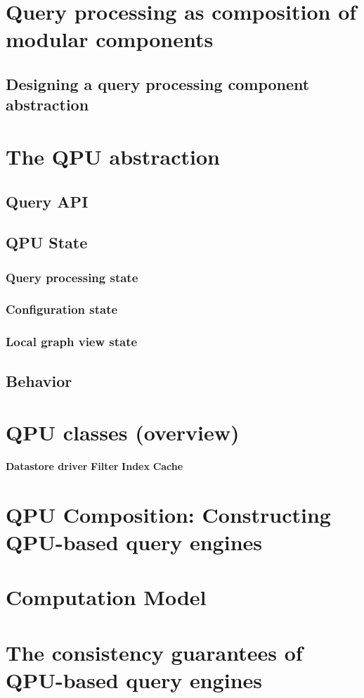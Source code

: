 \section{Query processing as composition of modular components}
\subsection{Designing a query processing component abstraction}


\section{The QPU abstraction}
\subsection{Query API}

\subsection{QPU State}
\subsubsection{Query processing state}
\subsubsection{Configuration state}
\subsubsection{Local graph view state}

\subsection{Behavior}


\section{QPU classes (overview)}
\textbf{Datastore driver}
\textbf{Filter}
\textbf{Index}
\textbf{Cache}

\section{QPU Composition: Constructing QPU-based query engines}


\section{Computation Model}


\section{The consistency guarantees of QPU-based query engines}

